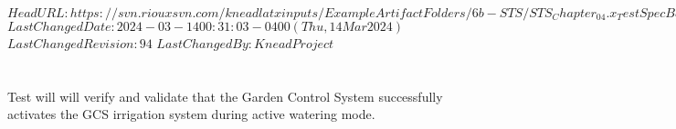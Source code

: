 \svnidlong
{$HeadURL: https://svn.riouxsvn.com/kneadlatxinputs/ExampleArtifactFolders/6b-STS/STS_Chapter_04.x_TestSpecBase.tex $}
{$LastChangedDate: 2024-03-14 00:31:03 -0400 (Thu, 14 Mar 2024) $}
{$LastChangedRevision: 94 $}
{$LastChangedBy: KneadProject $}

\section{\StsTestSpecID}
\label{loc:Test\StsTestSpecID}
% 

Test  will will verify and validate that the Garden Control System successfully
activates the GCS irrigation system during active watering mode.

\renewcommand{\StsTestCaseID}{Temperature Threshold}%

\renewcommand{\StsTestCaseID}{Soil Moisture Threshold}%



